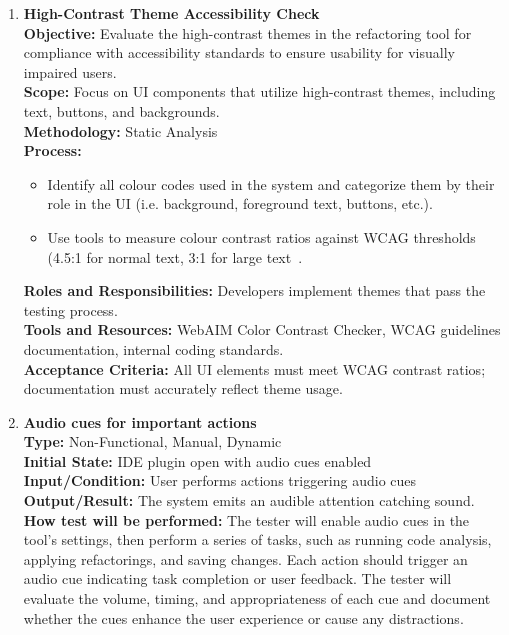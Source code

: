 \documentclass[12pt, titlepage]{article}
\begin{document}
\begin{enumerate}[label={\bf \textcolor{Maroon}{test-UH-\arabic*}}, wide=0pt, font=\itshape]
  \item \textbf{High-Contrast Theme Accessibility Check} \\[2mm]
    \textbf{Objective:} Evaluate the high-contrast themes in the refactoring tool for compliance with accessibility standards to ensure usability for visually impaired users. \\
    \textbf{Scope:} Focus on UI components that utilize high-contrast themes, including text, buttons, and backgrounds. \\
    \textbf{Methodology:} Static Analysis \\
    \textbf{Process:} 
    \begin{itemize}
      \item Identify all colour codes used in the system and categorize them by their role in the UI (i.e. background, foreground text, buttons, etc.).
      \item Use tools to measure colour contrast ratios against WCAG thresholds (4.5:1 for normal text, 3:1 for large text~\cite{WCAG}.
    \end{itemize}
    \textbf{Roles and Responsibilities:} Developers implement themes that pass the testing process. \\[2mm]
    \textbf{Tools and Resources:} WebAIM Color Contrast Checker, WCAG guidelines documentation, internal coding standards. \\[2mm]
    \textbf{Acceptance Criteria:} All UI elements must meet WCAG contrast ratios; documentation must accurately reflect theme usage.

  \item \textbf{Audio cues for important actions} \\[2mm]
    \textbf{Type:} Non-Functional, Manual, Dynamic \\
    \textbf{Initial State:} IDE plugin open with audio cues enabled \\
    \textbf{Input/Condition:} User performs actions triggering audio cues \\
    \textbf{Output/Result:} The system emits an audible attention catching sound. \\[2mm]
    \textbf{How test will be performed:} The tester will enable audio cues in the tool's settings, then perform a series of tasks, such as running code analysis, applying refactorings, and saving changes. Each action should trigger an audio cue indicating task completion or user feedback. The tester will evaluate the volume, timing, and appropriateness of each cue and document whether the cues enhance the user experience or cause any distractions. 


\end{enumerate}
\end{document}

